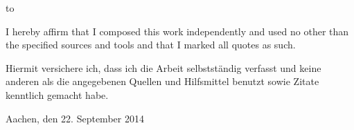 \thispagestyle{empty}
\vspace*{36\baselineskip}
\hbox to \textwidth{\hrulefill}

I hereby affirm that I composed this work independently and used no other than the specified sources and tools and that I marked all quotes as such.

Hiermit versichere ich, dass ich die Arbeit selbstständig verfasst und keine anderen als die angegebenen Quellen und Hilfsmittel benutzt sowie Zitate kenntlich gemacht habe.

Aachen, den 22. September 2014
